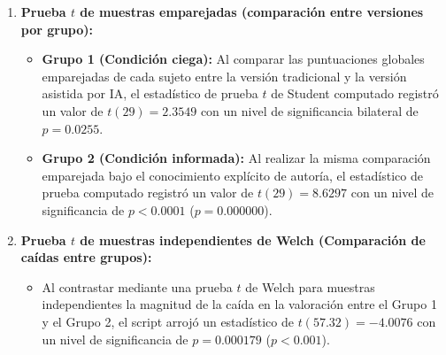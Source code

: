 \begin{enumerate}
    \item \textbf{Prueba $t$ de muestras emparejadas (comparación entre versiones por grupo):}
    \begin{itemize}
        \item \textbf{Grupo 1 (Condición ciega):} Al comparar las puntuaciones globales emparejadas de cada sujeto entre la versión tradicional y la versión asistida por IA, el estadístico de prueba $t$ de Student computado registró un valor de $t(29) = 2.3549$ con un nivel de significancia bilateral de $p = 0.0255$.
        \item \textbf{Grupo 2 (Condición informada):} Al realizar la misma comparación emparejada bajo el conocimiento explícito de autoría, el estadístico de prueba computado registró un valor de $t(29) = 8.6297$ con un nivel de significancia de $p < 0.0001$ ($p = 0.000000$).
    \end{itemize}
    \item \textbf{Prueba $t$ de muestras independientes de Welch (Comparación de caídas entre grupos):}
    \begin{itemize}
        \item Al contrastar mediante una prueba $t$ de Welch para muestras independientes la magnitud de la caída en la valoración entre el Grupo 1 y el Grupo 2, el script arrojó un estadístico de $t(57.32) = -4.0076$ con un nivel de significancia de $p = 0.000179$ ($p < 0.001$).
    \end{itemize}
\end{enumerate}